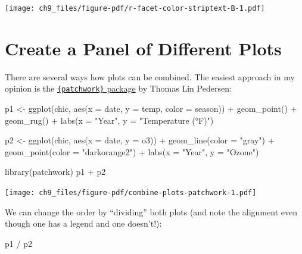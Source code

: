 \documentclass[
  letterpaper,
]{scrbook}
\newenvironment{Shaded}{\begin{snugshade}}{\end{snugshade}}
\newcommand{\AttributeTok}[1]{\textcolor[rgb]{0.40,0.45,0.13}{#1}}
\newcommand{\FunctionTok}[1]{\textcolor[rgb]{0.28,0.35,0.67}{#1}}
\newcommand{\NormalTok}[1]{\textcolor[rgb]{0.00,0.23,0.31}{#1}}
\newcommand{\OtherTok}[1]{\textcolor[rgb]{0.00,0.23,0.31}{#1}}
\newcommand{\SpecialCharTok}[1]{\textcolor[rgb]{0.37,0.37,0.37}{#1}}
\newcommand{\StringTok}[1]{\textcolor[rgb]{0.13,0.47,0.30}{#1}}
\begin{document}
\texttt{[image: ch9\_files/figure-pdf/r-facet-color-striptext-B-1.pdf]}

\section{Create a Panel of Different
Plots}\label{create-a-panel-of-different-plots}

There are several ways how plots can be combined. The easiest approach
in my opinion is the
\href{https://github.com/thomasp85/patchwork}{\texttt{\{patchwork\}}
package} by Thomas Lin Pedersen:

\begin{Shaded}
\begin{Highlighting}[]
\NormalTok{p1 }\OtherTok{\textless{}{-}} \FunctionTok{ggplot}\NormalTok{(chic, }\FunctionTok{aes}\NormalTok{(}\AttributeTok{x =}\NormalTok{ date, }\AttributeTok{y =}\NormalTok{ temp,}
                       \AttributeTok{color =}\NormalTok{ season)) }\SpecialCharTok{+}
        \FunctionTok{geom\_point}\NormalTok{() }\SpecialCharTok{+}
        \FunctionTok{geom\_rug}\NormalTok{() }\SpecialCharTok{+}
        \FunctionTok{labs}\NormalTok{(}\AttributeTok{x =} \StringTok{"Year"}\NormalTok{, }\AttributeTok{y =} \StringTok{"Temperature (°F)"}\NormalTok{)}

\NormalTok{p2 }\OtherTok{\textless{}{-}} \FunctionTok{ggplot}\NormalTok{(chic, }\FunctionTok{aes}\NormalTok{(}\AttributeTok{x =}\NormalTok{ date, }\AttributeTok{y =}\NormalTok{ o3)) }\SpecialCharTok{+}
        \FunctionTok{geom\_line}\NormalTok{(}\AttributeTok{color =} \StringTok{"gray"}\NormalTok{) }\SpecialCharTok{+}
        \FunctionTok{geom\_point}\NormalTok{(}\AttributeTok{color =} \StringTok{"darkorange2"}\NormalTok{) }\SpecialCharTok{+}
        \FunctionTok{labs}\NormalTok{(}\AttributeTok{x =} \StringTok{"Year"}\NormalTok{, }\AttributeTok{y =} \StringTok{"Ozone"}\NormalTok{)}

\FunctionTok{library}\NormalTok{(patchwork)}
\NormalTok{p1 }\SpecialCharTok{+}\NormalTok{ p2}
\end{Highlighting}
\end{Shaded}

\texttt{[image: ch9\_files/figure-pdf/combine-plots-patchwork-1.pdf]}

We can change the order by ``dividing'' both plots (and note the
alignment even though one has a legend and one doesn't!):

\begin{Shaded}
\begin{Highlighting}[]
\NormalTok{p1 }\SpecialCharTok{/}\NormalTok{ p2}
\end{Highlighting}
\end{Shaded}
\end{document}
